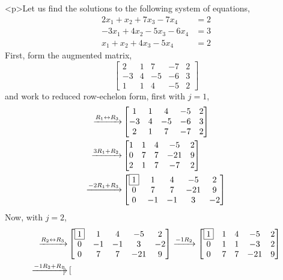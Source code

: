 \documentclass{ximera}
\begin{document}
\begin{example}
<p>Let us find the solutions to the following system of equations,
\begin{align*}
2x_1  + x_2 + 7x_3 - 7x_4 &= 2 \\
-3x_1 + 4x_2 -5x_3 - 6x_4 &=  3 \\
x_1 +x_2 + 4x_3 - 5x_4 &=  2
\end{align*}
First, form the augmented matrix,
\[
\begin{bmatrix}
2 & 1 & 7 & -7 & 2\\
-3 & 4 &  -5 & -6 &  3\\
1 & 1 & 4 &  -5 & 2
\end{bmatrix}
\]
and work to reduced row-echelon form, first with $j=1$,
\begin{align*}
\xrightarrow{R_{1}\leftrightarrow R_{3}}
&
\begin{bmatrix}
1 & 1 & 4 &  -5 & 2\\
-3 & 4 &  -5 & -6 &  3\\
2 & 1 & 7 & -7 & 2
\end{bmatrix} \\
\xrightarrow{3R_{1}+R_{2}} &
\begin{bmatrix}
1 & 1 & 4 &  -5 & 2\\
0 & 7 &  7 & -21 &  9\\
2 & 1 & 7 & -7 & 2
\end{bmatrix}\\
\xrightarrow{-2R_{1}+R_{3}} &
\begin{bmatrix}
\fbox{1} & 1 & 4 &  -5 & 2\\
0 & 7 &  7 & -21 &  9\\
0 & -1 & -1 & 3 & -2
\end{bmatrix} 
\end{align*}
Now, with $j=2$,
\begin{align*}
\xrightarrow{R_{2}\leftrightarrow R_{3}}
&
\begin{bmatrix}
\fbox{1} & 1 & 4 &  -5 & 2\\
0 & -1 & -1 & 3 & -2\\
0 & 7 &  7 & -21 &  9
\end{bmatrix}
\xrightarrow{-1R_{2}}
\begin{bmatrix}
\fbox{1} & 1 & 4 &  -5 & 2\\
0 & 1 & 1 & -3 & 2\\
0 & 7 &  7 & -21 &  9
\end{bmatrix}\\
\xrightarrow{-1R_{2}+R_{1}}
&
\begin{bmatrix}

\end{bmatrix}
\end{align*}
\end{example}
\end{document}
